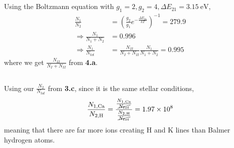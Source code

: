 \documentclass{article}
\begin{document}
\subsection{}

Using the Boltzmann equation with \(g_1 = 2, g_2 = 4, \Delta E_{21} = \SI{3.15}{\electronvolt}\),
\begin{align}
    \frac{N_1}{N_2} &= \left(\frac{g_2}{g_1} e^{-\frac{\Delta E_{21}}{kT}}\right)^{-1} = \num{279.9} \\
    \Rightarrow \frac{N_1}{N_1 + N_2} &= \num{0.996} \\
    \Rightarrow \frac{N_1}{N_{tot}} &= \frac{N_{II}}{N_I + N_{II}} \frac{N_1}{N_1 + N_2} = \num{0.995}
\end{align}
where we get \(\frac{N_{II}}{N_I + N_{II}}\) from \textbf{4.a}.

\subsection{}

Using our \(\frac{N_2}{N_{tot}}\) from \textbf{3.c}, since it is the same stellar conditions,
\begin{equation}
    \frac{N_{1, \ce{Ca}}}{N_{2, \ce{H}}} = \frac{\frac{N_{1, \ce{Ca}}}{\cancel{N_{tot}}}}{\frac{N_{2, \ce{H}}}{\cancel{N_{tot}}}} = \num{1.97e+8}
\end{equation}
meaning that there are far more  ions creating H and K lines than Balmer hydrogen atoms.
\end{document}
